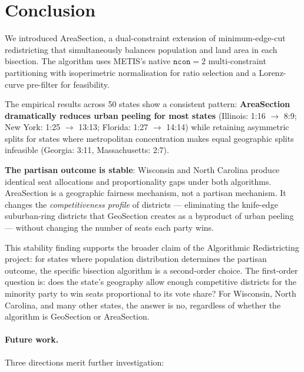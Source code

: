\section{Conclusion}
\label{sec:conclusion}

We introduced AreaSection, a dual-constraint extension of minimum-edge-cut
redistricting that simultaneously balances population and land area in each
bisection.
The algorithm uses METIS's native $\mathtt{ncon}=2$ multi-constraint
partitioning with isoperimetric normalisation for ratio selection and a
Lorenz-curve pre-filter for feasibility.

The empirical results across 50 states show a consistent pattern:
\textbf{AreaSection dramatically reduces urban peeling for most states}
(Illinois: 1:16 $\to$ 8:9; New York: 1:25 $\to$ 13:13;
Florida: 1:27 $\to$ 14:14) while retaining asymmetric splits for states
where metropolitan concentration makes equal geographic splits infeasible
(Georgia: 3:11, Massachusetts: 2:7).

\textbf{The partisan outcome is stable}: Wisconsin and North Carolina
produce identical seat allocations and proportionality gaps under both
algorithms.
AreaSection is a geographic fairness mechanism, not a partisan mechanism.
It changes the \emph{competitiveness profile} of districts ---
eliminating the knife-edge suburban-ring districts that GeoSection
creates as a byproduct of urban peeling --- without changing the number
of seats each party wins.

This stability finding supports the broader claim of the Algorithmic
Redistricting project: for states where population distribution determines
the partisan outcome, the specific bisection algorithm is a second-order
choice.
The first-order question is: does the state's geography allow enough
competitive districts for the minority party to win seats proportional to
its vote share?
For Wisconsin, North Carolina, and many other states, the answer is no,
regardless of whether the algorithm is GeoSection or AreaSection.

\paragraph{Future work.}
Three directions merit further investigation:

